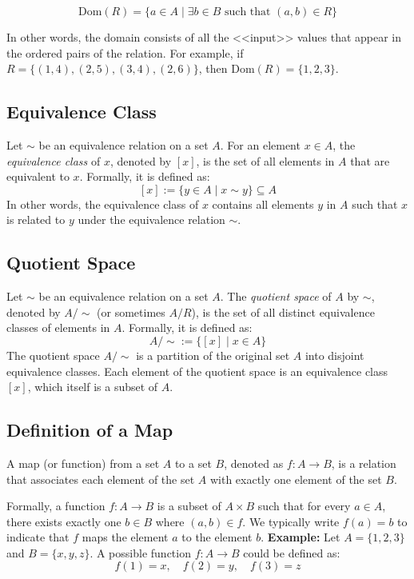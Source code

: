 \[\text{Dom}(R) = \{a \in A \mid \exists b \in B \text{ such that } (a,b) \in R\}\]

In other words, the domain consists of all the <<input>> values that appear in the ordered pairs of the relation. For example, if \(R = \{(1,4), (2,5), (3,4), (2,6)\}\), then \(\text{Dom}(R) = \{1, 2, 3\}\).

\subsection{Equivalence Class}

Let \(\sim\) be an equivalence relation on a set \(A\). For an element \(x \in A\), the \emph{equivalence class} of \(x\), denoted by \([x]\), is the set of all elements in \(A\) that are equivalent to \(x\). Formally, it is defined as:
\[[x] := \{y \in A \mid x \sim y\} \subseteq A\]
In other words, the equivalence class of \(x\) contains all elements \(y\) in \(A\) such that \(x\) is related to \(y\) under the equivalence relation \(\sim\).

\subsection{Quotient Space}

Let \(\sim\) be an equivalence relation on a set \(A\). The \emph{quotient space} of \(A\) by \(\sim\), denoted by \(A/\sim\) (or sometimes \(A/R\)), is the set of all distinct equivalence classes of elements in \(A\). Formally, it is defined as:
\[A/\sim := \{[x] \mid x \in A\}\]
The quotient space \(A/\sim\) is a partition of the original set \(A\) into disjoint equivalence classes. Each element of the quotient space is an equivalence class \([x]\), which itself is a subset of \(A\).

\subsection{Definition of a Map}
A map (or function) from a set \(A\) to a set \(B\), denoted as \(f: A \to B\), is a relation that associates each element of the set \(A\) with exactly one element of the set \(B\).

Formally, a function \(f: A \to B\) is a subset of \(A \times B\) such that for every \(a \in A\), there exists exactly one \(b \in B\) where \((a,b) \in f\). We typically write \(f(a) = b\) to indicate that \(f\) maps the element \(a\) to the element \(b\).
\newline
\textbf{Example:} Let \(A = \{1, 2, 3\}\) and \(B = \{x, y, z\}\). A possible function \(f: A \to B\) could be defined as:
\[
	f(1) = x, \quad f(2) = y, \quad f(3) = z
\]

